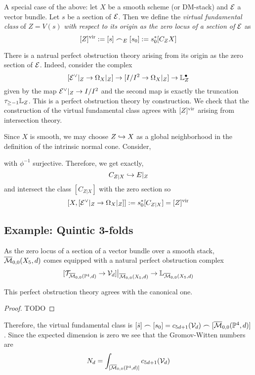 \documentclass[12pt]{article}
\newcommand{\Mbar}{\ol{\M}}
\begin{document}
A special case of the above: let $X$ be a smooth scheme (or DM-stack) and $\mathcal{E}$ a vector bundle. Let $s$ be a section of $\mathcal{E}$. Then we define the \textit{virtual fundamental class} of $Z = V(s)$ \textit{with respect to its origin as the zero locus of a section of $\mathcal{E}$} as
\[ [Z]^{\mathrm{vir}} := [s] \frown_{E} [s_0] := s^*_0 [C_{Z} X] \]

There is a natrual perfect obstruction theory arising from its origin as the zero section of $\mathcal{E}$. Indeed, consider the complex
\[ [\mathcal{E}^\vee|_Z \to \Omega_X|_Z] \to [I/I^2 \to \Omega_X |_Z] \to \mathbb{L}_Z^\bullet \]
given by the map $\mathcal{E}^\vee|_Z \to I / I^2$ and the second map is exactly the truncation $\tau_{\ge -1} \mathbb{L}_Z$. This is a perfect obstruction theory by construction. We check that the construction of the virtual fundamental class agrees with $[Z]^{\mathrm{vir}}$ arising from intersection theory. 
\par 
Since $X$ is smooth, we may choose $Z \hookrightarrow X$ as a global neighborhood in the definition of the intrinsic normal cone. Consider,
\begin{center}
\end{center}
with $\phi^{-1}$ surjective. Therefore, we get exactly, 
\[ C_{Z|X} \hookrightarrow E|_Z \]
and intersect the class $[C_{Z|X}]$ with the zero section so
\[ [X, [\mathcal{E}^\vee|_Z \to \Omega_X|_Z]] := s^*_0 [C_{Z|X}] = [Z]^{\mathrm{vir}} \]

\subsection{Example: Quintic 3-folds}

As the zero locus of a section of a vector bundle over a smooth stack, $\Mbar_{0,0}(X_5, d)$ comes equipped with a natural perfect obstruction complex
\[ [ \T_{\Mbar_{0,0}(\P^4, d)} \to \cV_d] \big|_{\Mbar_{0,0}(X_5, d)} \to \LL_{\Mbar_{0,0}(X_5, d)} \]

\begin{lemma}
This perfect obstruction theory agrees with the canonical one.
\end{lemma}

\begin{proof}
{\color{red} TODO}
\end{proof}

Therefore, the virtual fundamental class is $[\bar{s}] \frown [s_0] = c_{5d + 1}(\cV_d) \frown [\Mbar_{0,0}(\P^4, d)]$. Since the expected dimension is zero we see that the Gromov-Witten numbers are
\[ N_d = \int_{[\Mbar_{0,0}(\P^4, d)]} c_{5d + 1}(\cV_d) \]
\end{document}
